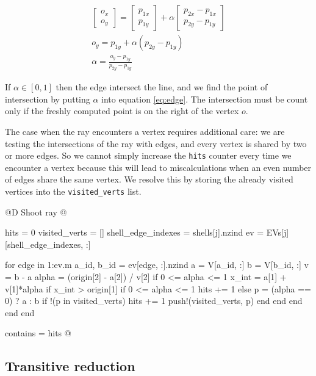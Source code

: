 \documentclass[10pt]{book}
\begin{document}
\begin{gather*}
    \begin{bmatrix}
        o_x \\ o_y
    \end{bmatrix}
    = 
    \begin{bmatrix}
        p_{1x} \\ p_{1y}
    \end{bmatrix}
    +
    \alpha
    \begin{bmatrix}
        p_{2x} - p_{1x} \\ p_{2y} - p_{1y}
    \end{bmatrix} \\
    o_y = p_{1y} + \alpha(p_{2y} - p_{1y}) \\
    \alpha = \frac{o_y - p_{1y}}{p_{2y} - p_{1y}}
\end{gather*}

If $\alpha\in[0, 1]$ then the edge intersect the line, and we find the point
of intersection by putting $\alpha$ into equation \ref{eq:edge}.
The intersection must be count only if the freshly computed point
is on the right of the vertex $o$.

The case when the ray encounters a vertex requires additional care:
we are testing the intersections of the ray with edges, and every
vertex is shared by two or more edges. So we cannot simply increase the 
\texttt{hits} counter every time we encounter a vertex because this will lead
to miscalculations when an even number of edges share the same vertex.
We resolve this by storing the already visited vertices into the 
\texttt{visited\_verts} list.

@D Shoot ray
@{hits = 0
visited_verts = []
shell_edge_indexes = shells[j].nzind
ev = EVs[j][shell_edge_indexes, :]

for edge in 1:ev.m
    a_id, b_id = ev[edge, :].nzind
    a = V[a_id, :]
    b = V[b_id, :]
    v = b - a
    alpha = (origin[2] - a[2]) / v[2]
    if 0 <= alpha <= 1
        x_int = a[1] + v[1]*alpha
        if x_int > origin[1]
            if 0 <= alpha <= 1
                hits += 1
            else
                p = (alpha == 0) ? a : b
                if !(p in visited_verts)
                    hits += 1
                    push!(visited_verts, p)
                end
            end
        end
    end
end

contains = hits %
@}


\subsection{Transitive reduction}
\end{document}
